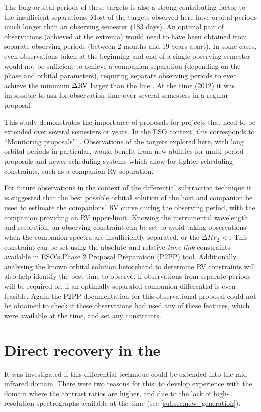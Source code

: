 The long orbital periods of these targets is also a strong contributing factor to the insufficient separations.
Most of the targets observed here have orbital periods much longer than an observing semester (183 days).
An optimal pair of observations (achieved at the extrema) would need to have been obtained from separate observing periods (between 2 months and 19 years apart).
In some cases, even observations taken at the beginning and end of a single observing semester would not be sufficient to achieve a companion separation (depending on the phase and orbital parameters), requiring separate observing periods to even achieve the minimum \(\Delta \rm {RV}\) larger than the line {\fwhm}.
At the time (2012) it was impossible to ask for observation time over several semesters in a regular proposal.

This study demonstrates the importance of proposals for projects that need to be extended over several semesters or years.
In the {ESO} context, this corresponds to ``Monitoring proposals''~\citep[e.g.][pg.~18]{eso_eso_2017}.
Observations of the targets explored here, with long orbital periods in particular, would benefit from new abilities for multi-period proposals and newer scheduling systems which allow for tighter scheduling constraints, such as a companion {RV} separation.

For future observations in the context of the differential subtraction technique it is suggested that the best possible orbital solution of the host and companion be used to estimate the companions' {RV} curve during the observing period, with the companion \Mtwosini{} providing an {RV} upper-limit.
Knowing the instrumental wavelength and resolution, an observing constraint can be set to avoid taking observations when the companion spectra are insufficiently separated, or the \(\Delta {RV}_2\) < {\fwhm}.
This constraint can be set using the absolute and relative \emph{time-link} constraints available in {ESO}'s {Phase 2 Proposal Preparation} (P2PP) tool.
Additionally, analysing the known orbital solution beforehand to determine {RV} constraints will also help identify the best time to observe, if observations from separate periods will be required or, if an optimally separated companion differential is even feasible.
Again the P2PP documentation for this observational proposal could not be obtained to check if these observations had used any of these features, which were available at the time, and set any constraints.


\section{Direct recovery in the \mir{}}
It was investigated if this differential technique could be extended into the mid-infrared {\mir{}} domain.
There were two reasons for this: to develop experience with the {\mir{}} domain where the contrast ratios are higher, and due to the lack of high-resolution \nir{} spectrographs available at the time (see \cref{subsec:new_generation}).

